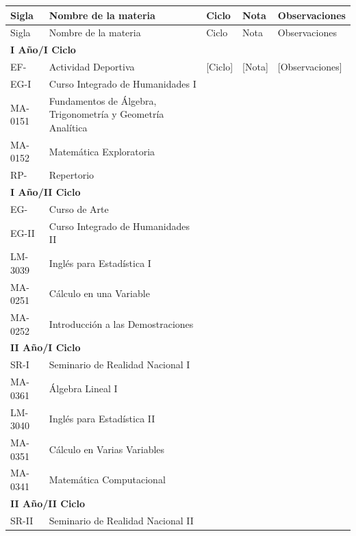 \begin{longtable}{|p{2cm}|p{7cm}|p{1.6cm}|p{1.6cm}|p{2.8cm}|}
\hline
\rowcolor[HTML]{00C0F3}
Sigla & Nombre de la materia & Ciclo & Nota & Observaciones \\ \hline
\endfirsthead
\hline
\rowcolor[HTML]{00C0F3}
Sigla & Nombre de la materia & Ciclo & Nota & Observaciones \\ \hline
\endhead
\multicolumn{5}{|l|}{\cellcolor[HTML]{E6E6E6}\textbf{I Año/I Ciclo}} \\ \hline
EF- & Actividad Deportiva & [Ciclo] & [Nota] & [Observaciones] \\ \hline
EG-I & Curso Integrado de Humanidades I &  &  &  \\ \hline
MA-0151 & Fundamentos de Álgebra, Trigonometría y Geometría Analítica &  &  &  \\ \hline
MA-0152 & Matemática Exploratoria &  &  &  \\ \hline
RP- & Repertorio &  &  &  \\ \hline
\multicolumn{5}{|l|}{\cellcolor[HTML]{E6E6E6}\textbf{I Año/II Ciclo}} \\ \hline
EG- & Curso de Arte &  &  &  \\ \hline
EG-II & Curso Integrado de Humanidades II &  &  &  \\ \hline
LM-3039 & Inglés para Estadística I &  &  &  \\ \hline
MA-0251 & Cálculo en una Variable &  &  &  \\ \hline
MA-0252 & Introducción a las Demostraciones &  &  &  \\ \hline
\multicolumn{5}{|l|}{\cellcolor[HTML]{E6E6E6}\textbf{II Año/I Ciclo}} \\ \hline
SR-I & Seminario de Realidad Nacional I &  &  &  \\ \hline
MA-0361 & Álgebra Lineal I &  &  &  \\ \hline
LM-3040 & Inglés para Estadística II &  &  &  \\ \hline
MA-0351 & Cálculo en Varias Variables &  &  &  \\ \hline
MA-0341 & Matemática Computacional &  &  &  \\ \hline
\multicolumn{5}{|l|}{\cellcolor[HTML]{E6E6E6}\textbf{II Año/II Ciclo}} \\ \hline
SR-II & Seminario de Realidad Nacional II &  &  &  \\ \hline

\end{longtable}
